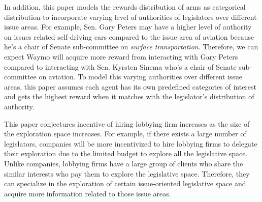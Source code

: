 \documentclass{article}
\begin{document}
In addition, this paper models the rewards distribution of arms as categorical distribution to incorporate varying level of authorities of legislators over different issue areas.
For example, Sen. Gary Peters may have a higher level of authority on issues related self-driving cars compared to the issue area of aviation because he's a chair of Senate sub-committee on \textit{surface transportation}.
Therefore, we can expect Waymo will acquire more reward from interacting with Gary Peters compared to interacting with Sen. Kyrsten Sinema who's a chair of Senate sub-committee on aviation.
To model this varying authorities over different issue areas, this paper assumes each agent has its own predefined categories of interest and gets the highest reward when it matches with the legislator's distribution of authority. 

This paper conjectures incentive of hiring lobbying firm increases as the size of the exploration space increases.
For example, if there exists a large number of legislators, companies will be more incentivized to hire lobbying firms to delegate their exploration due to the limited budget to explore all the legislative space.
Unlike companies, lobbying firms have a large group of clients who share the similar interests who pay them to explore the legislative space.
Therefore, they can specialize in the exploration of certain issue-oriented legislative space and acquire more information related to those issue areas.
\end{document}
